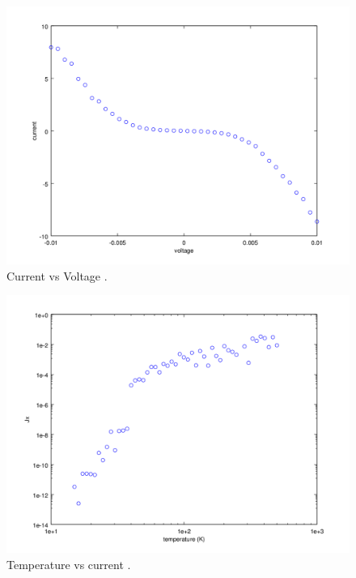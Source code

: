 \begin{figure}[htbp]
\begin{center}
\includegraphics[scale=.50]{VvJGreat.png}
\caption{Current vs Voltage .}
\label{JvsV}
\end{center}
\end{figure}

\begin{figure}[htbp]
\begin{center}
\includegraphics[scale=.50]{JvsT.png}
\caption{Temperature vs current .}
\label{TvJ}
\end{center}
\end{figure}

